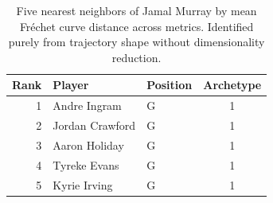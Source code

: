 \begin{table}[htbp]
  \centering\small
  \begin{tabular}{rllc}
    \toprule
    Rank & Player & Position & Archetype \\
    \midrule
    1 & Andre Ingram & G & 1 \\
    2 & Jordan Crawford & G & 1 \\
    3 & Aaron Holiday & G & 1 \\
    4 & Tyreke Evans & G & 1 \\
    5 & Kyrie Irving & G & 1 \\
    \bottomrule
  \end{tabular}
  \caption{Five nearest neighbors of Jamal Murray by mean Fr\'{e}chet curve distance across metrics. Identified purely from trajectory shape without dimensionality reduction.}
  \label{tab:Jamal_Murray_frechet_curve_neighbors}
\end{table}

